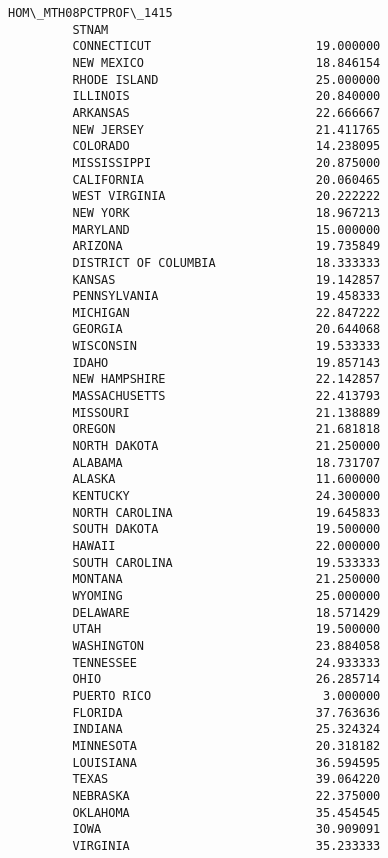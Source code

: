 \documentclass[11pt]{article}
\begin{document}
\begin{Verbatim}[commandchars=\\\{\}]
                               HOM\_MTH08PCTPROF\_1415  
         STNAM                                        
         CONNECTICUT                       19.000000  
         NEW MEXICO                        18.846154  
         RHODE ISLAND                      25.000000  
         ILLINOIS                          20.840000  
         ARKANSAS                          22.666667  
         NEW JERSEY                        21.411765  
         COLORADO                          14.238095  
         MISSISSIPPI                       20.875000  
         CALIFORNIA                        20.060465  
         WEST VIRGINIA                     20.222222  
         NEW YORK                          18.967213  
         MARYLAND                          15.000000  
         ARIZONA                           19.735849  
         DISTRICT OF COLUMBIA              18.333333  
         KANSAS                            19.142857  
         PENNSYLVANIA                      19.458333  
         MICHIGAN                          22.847222  
         GEORGIA                           20.644068  
         WISCONSIN                         19.533333  
         IDAHO                             19.857143  
         NEW HAMPSHIRE                     22.142857  
         MASSACHUSETTS                     22.413793  
         MISSOURI                          21.138889  
         OREGON                            21.681818  
         NORTH DAKOTA                      21.250000  
         ALABAMA                           18.731707  
         ALASKA                            11.600000  
         KENTUCKY                          24.300000  
         NORTH CAROLINA                    19.645833  
         SOUTH DAKOTA                      19.500000  
         HAWAII                            22.000000  
         SOUTH CAROLINA                    19.533333  
         MONTANA                           21.250000  
         WYOMING                           25.000000  
         DELAWARE                          18.571429  
         UTAH                              19.500000  
         WASHINGTON                        23.884058  
         TENNESSEE                         24.933333  
         OHIO                              26.285714  
         PUERTO RICO                        3.000000  
         FLORIDA                           37.763636  
         INDIANA                           25.324324  
         MINNESOTA                         20.318182  
         LOUISIANA                         36.594595  
         TEXAS                             39.064220  
         NEBRASKA                          22.375000  
         OKLAHOMA                          35.454545  
         IOWA                              30.909091  
         VIRGINIA                          35.233333  
\end{Verbatim}
            
\end{document}
